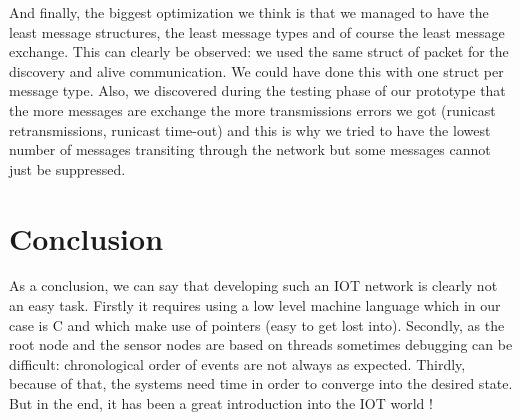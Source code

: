 \documentclass[a4paper,10pt]{article}
\begin{document}
And finally, the biggest optimization we think is that we managed to have the least message structures, the least message types and of course the least message exchange. This can clearly be observed: we used the same struct of packet for the discovery and alive communication. We could have done this with one struct per message type. Also, we discovered during the testing phase of our prototype that the more messages are exchange the more transmissions errors we got (runicast retransmissions, runicast time-out) and this is why we tried to have the lowest number of messages transiting through the network but some messages cannot just be suppressed.

\section{Conclusion}

As a conclusion, we can say that developing such an IOT network is clearly not an easy task. Firstly it requires using a low level machine language which in our case is C and which make use of pointers (easy to get lost into). Secondly, as the root node and the sensor nodes are based on threads sometimes debugging can be difficult: chronological order of events are not always as expected. Thirdly, because of that, the systems need time in order to converge into the desired state. But in the end, it has been a great introduction into the IOT world !
\end{document}
